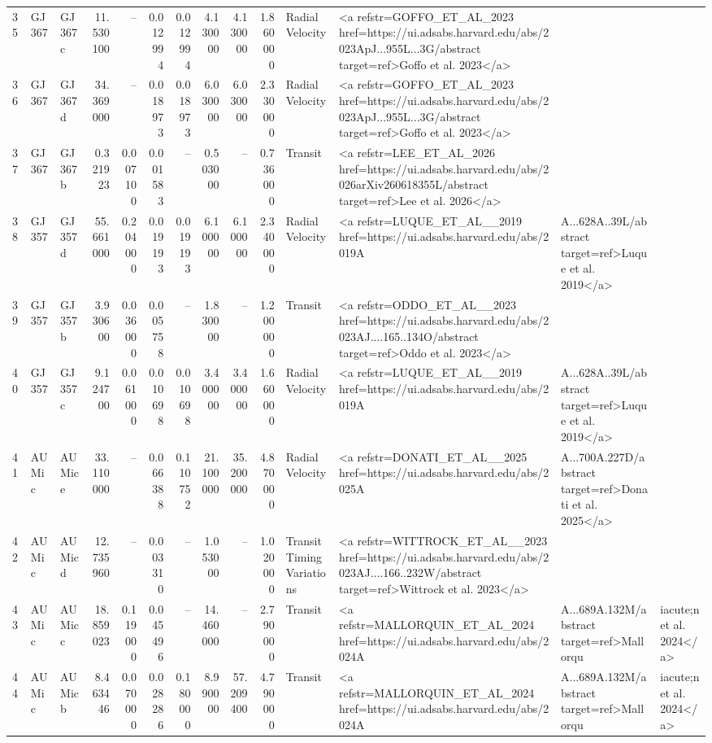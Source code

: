 \begin{tabular}{lllrrrrrrrll}
35 & GJ 367 & GJ 367 c & 11.530100 & -- & 0.012994 & 0.012994 & 4.130000 & 4.130000 & 1.860000 & Radial Velocity & <a refstr=GOFFO_ET_AL_2023 href=https://ui.adsabs.harvard.edu/abs/2023ApJ...955L...3G/abstract target=ref>Goffo et al. 2023</a> \\
36 & GJ 367 & GJ 367 d & 34.369000 & -- & 0.018973 & 0.018973 & 6.030000 & 6.030000 & 2.330000 & Radial Velocity & <a refstr=GOFFO_ET_AL_2023 href=https://ui.adsabs.harvard.edu/abs/2023ApJ...955L...3G/abstract target=ref>Goffo et al. 2023</a> \\
37 & GJ 367 & GJ 367 b & 0.321923 & 0.007100 & 0.001583 & -- & 0.503000 & -- & 0.736000 & Transit & <a refstr=LEE_ET_AL_2026 href=https://ui.adsabs.harvard.edu/abs/2026arXiv260618355L/abstract target=ref>Lee et al. 2026</a> \\
38 & GJ 357 & GJ 357 d & 55.661000 & 0.204000 & 0.019193 & 0.019193 & 6.100000 & 6.100000 & 2.340000 & Radial Velocity & <a refstr=LUQUE_ET_AL__2019 href=https://ui.adsabs.harvard.edu/abs/2019A&A...628A..39L/abstract target=ref>Luque et al. 2019</a> \\
39 & GJ 357 & GJ 357 b & 3.930600 & 0.036000 & 0.005758 & -- & 1.830000 & -- & 1.200000 & Transit & <a refstr=ODDO_ET_AL__2023 href=https://ui.adsabs.harvard.edu/abs/2023AJ....165..134O/abstract target=ref>Oddo et al. 2023</a> \\
40 & GJ 357 & GJ 357 c & 9.124700 & 0.061000 & 0.010698 & 0.010698 & 3.400000 & 3.400000 & 1.660000 & Radial Velocity & <a refstr=LUQUE_ET_AL__2019 href=https://ui.adsabs.harvard.edu/abs/2019A&A...628A..39L/abstract target=ref>Luque et al. 2019</a> \\
41 & AU Mic & AU Mic e & 33.110000 & -- & 0.066388 & 0.110752 & 21.100000 & 35.200000 & 4.870000 & Radial Velocity & <a refstr=DONATI_ET_AL__2025 href=https://ui.adsabs.harvard.edu/abs/2025A&A...700A.227D/abstract target=ref>Donati et al. 2025</a> \\
42 & AU Mic & AU Mic d & 12.735960 & -- & 0.003310 & -- & 1.053000 & -- & 1.020000 & Transit Timing Variations & <a refstr=WITTROCK_ET_AL__2023 href=https://ui.adsabs.harvard.edu/abs/2023AJ....166..232W/abstract target=ref>Wittrock et al. 2023</a> \\
43 & AU Mic & AU Mic c & 18.859023 & 0.119000 & 0.045496 & -- & 14.460000 & -- & 2.790000 & Transit & <a refstr=MALLORQUIN_ET_AL_2024 href=https://ui.adsabs.harvard.edu/abs/2024A&A...689A.132M/abstract target=ref>Mallorqu&iacute;n et al. 2024</a> \\
44 & AU Mic & AU Mic b & 8.463446 & 0.070000 & 0.028286 & 0.180000 & 8.990000 & 57.209400 & 4.790000 & Transit & <a refstr=MALLORQUIN_ET_AL_2024 href=https://ui.adsabs.harvard.edu/abs/2024A&A...689A.132M/abstract target=ref>Mallorqu&iacute;n et al. 2024</a> \\

\end{tabular}

